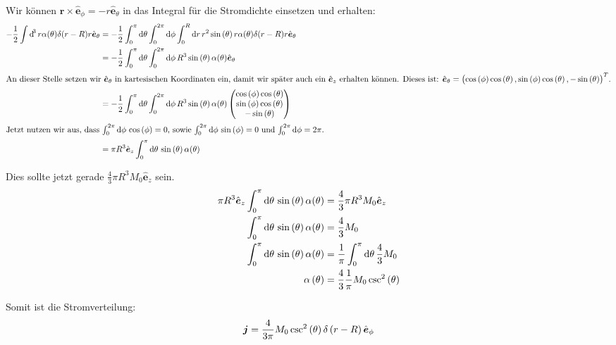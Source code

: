\documentclass[11pt, ngerman, fleqn]{article}
\newcommand{\ev}{\hat{\vec e}}
\newcommand{\half}{\frac 12}
\renewcommand{\vec}[1]{\boldsymbol{#1}}
\begin{document}
Wir können $\vec r \times \ev_\phi = - r \ev_\theta$ in das Integral für die Stromdichte einsetzen und erhalten:
\begin{align*}
	- \half \int \dif^3 r \alpha(\theta) \delta(r-R) r \ev_\theta
	&= - \half \int_0^\pi \dif \theta \int_0^{2 \pi} \dif \phi \int_0^R \dif r \, r^2 \sin\del\theta r \alpha(\theta) \delta(r-R) r \ev_\theta \\
	&= - \half \int_0^\pi \dif \theta \int_0^{2 \pi} \dif \phi \, R^3 \sin\del\theta \alpha(\theta) \ev_\theta \\
	\intertext{An dieser Stelle setzen wir $\ev_\theta$ in kartesischen Koordinaten ein, damit wir später auch ein $\ev_z$ erhalten können. Dieses ist: $\ev_\theta = \del{\cos\del\phi \cos\del\theta, \sin\del\phi \cos\del\theta, - \sin\del\theta}^T$.}
	&= - \half \int_0^\pi \dif \theta \int_0^{2 \pi} \dif \phi \, R^3 \sin\del\theta \alpha(\theta) \begin{pmatrix}
		\cos\del\phi \cos\del\theta \\ \sin\del\phi \cos\del\theta \\ - \sin\del\theta
	\end{pmatrix} \\
	\intertext{Jetzt nutzen wir aus, dass $\int_0^{2\pi} \dif \phi \, \cos\del\phi = 0$, sowie $\int_0^{2\pi} \dif \phi \, \sin\del\phi = 0$ und $\int_0^{2\pi} \dif \phi = 2\pi$.}
	&= \pi R^3 \ev_z \int_0^\pi \dif \theta \, \sin\del\theta \alpha(\theta)
\end{align*}

Dies sollte jetzt gerade $\frac 43 \pi R^3 M_0 \ev_z$ sein.
\begin{align*}
	\pi R^3 \ev_z \int_0^\pi \dif \theta \, \sin\del\theta \alpha(\theta) &= \frac 43 \pi R^3 M_0 \ev_z \\
	\int_0^\pi \dif \theta \, \sin\del\theta \alpha(\theta) &= \frac 43 M_0 \\
	\int_0^\pi \dif \theta \, \sin\del\theta \alpha(\theta) &= \frac 1\pi \int_0^\pi \dif \theta \, \frac 43 M_0 \\
	\alpha\del\theta &= \frac 43 \frac 1\pi M_0 \csc^2\del\theta
\end{align*}

Somit ist die Stromverteilung:
\[
	\vec j = \frac 4{3\pi} M_0 \csc^2\del\theta \delta\del{r-R} \ev_\phi
\]

\end{document}
